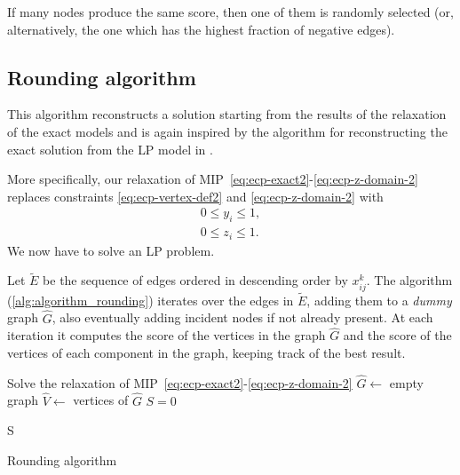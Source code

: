 If many nodes produce the same score, then one of them is
randomly selected (or, alternatively, the one which has the highest fraction of
negative edges).

\subsection{Rounding algorithm}%
\label{ssub:rounding_algorithm}

This algorithm reconstructs a solution starting from the results of the
relaxation of the exact models and is again inspired by the algorithm for
reconstructing the exact solution from the \acrshort{LP} model in
\cite{charikar2000greedy}.

More specifically, our relaxation of
MIP~\eqref{eq:ecp-exact2}-\eqref{eq:ecp-z-domain-2} replaces constraints
\eqref{eq:ecp-vertex-def2} and \eqref{eq:ecp-z-domain-2} with
\begin{gather}
	0 \leq y_i \leq 1, \\
	0 \leq z_i \leq 1.
\end{gather}
We now have to solve an \acrshort{LP} problem.

Let $\tilde{E}$ be the sequence of edges ordered in descending order by $x_{ij}
		^{k} $. The algorithm (\autoref{alg:algorithm_rounding}) iterates over
the edges in $\tilde{E}$, adding them to a \emph{dummy} graph $\hat{G}$, also eventually
adding incident nodes if not already present. At each iteration it computes
the score of the vertices in the graph $\hat{G}$ and the score
of the vertices of each component in the graph, keeping track of the best
result.

\begin{algorithm}
	\SetAlgoLined
	Solve the relaxation of MIP~\eqref{eq:ecp-exact2}-\eqref{eq:ecp-z-domain-2}
	\;
	$\hat{G} \leftarrow $ empty graph \;
	$\hat{V} \leftarrow $ vertices of $\hat{G}$ \;
	$S = 0$


	\Return S \;
	\caption{Rounding algorithm}
	\label{alg:algorithm_rounding}
\end{algorithm}

